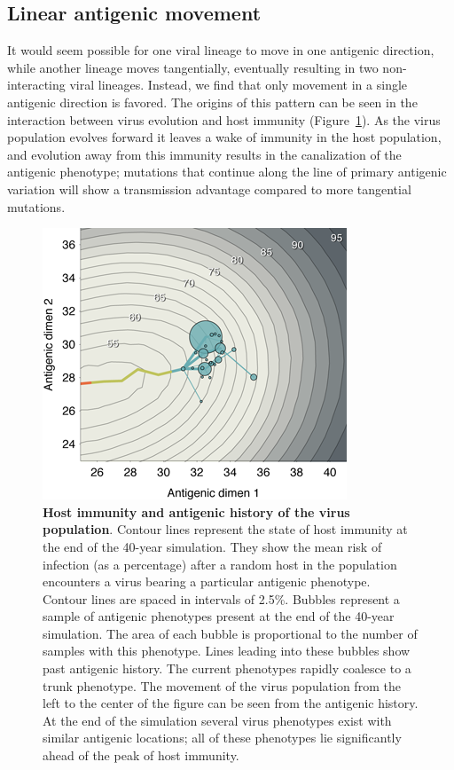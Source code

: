 \documentclass[11pt,oneside,letterpaper]{article}
\begin{document}
\subsection*{Linear antigenic movement}

It would seem possible for one viral lineage to move in one antigenic direction, while another lineage moves tangentially, eventually resulting in two non-interacting viral lineages.  Instead, we find that only movement in a single antigenic direction is favored.  The origins of this pattern can be seen in the interaction between virus evolution and host immunity (Figure~\ref{immunity}).  As the virus population evolves forward it leaves a wake of immunity in the host population, and evolution away from this immunity results in the canalization of the antigenic phenotype; mutations that continue along the line of primary antigenic variation will show a transmission advantage compared to more tangential mutations.  

\begin{figure}[H]
	\centering
	\includegraphics{figures/immunity}
	\caption{\textbf{Host immunity and antigenic history of the virus population}.  Contour lines represent the state of host immunity at the end of the 40-year simulation.  They show the mean risk of infection (as a percentage) after a random host in the population encounters a virus bearing a particular antigenic phenotype.  Contour lines are spaced in intervals of 2.5\%. Bubbles represent a sample of antigenic phenotypes present at the end of the 40-year simulation.  The area of each bubble is proportional to the number of samples with this phenotype.  Lines leading into these bubbles show past antigenic history.  The current phenotypes rapidly coalesce to a trunk phenotype.  The movement of the virus population from the left to the center of the figure can be seen from the antigenic history.  At the end of the simulation several virus phenotypes exist with similar antigenic locations; all of these phenotypes lie significantly ahead of the peak of host immunity.}
	\label{immunity}
\end{figure}
\end{document}

